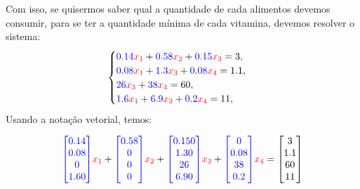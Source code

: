 \begin{frame}[label=vetores]
Com isso, se quisermos saber qual a quantidade de cada alimentos devemos consumir, para se ter a quantidade mínima de cada vitamina, devemos resolver o sistema:
\[
\begin{cases}
{\color{blue}0.14 } {\color{red}x_1}+ {\color{blue}0.58}{\color{red}x_2}+ {\color{blue}0.15}{\color{red}x_3}= 3,\\
{\color{blue}0.08}{\color{red}x_1}+{\color{blue}1.3}{\color{red}x_3}+{\color{blue}0.08}{\color{red}x_4}= 1.1,\\
{\color{blue}26}{\color{red}x_3}+{\color{blue}38}{\color{red}x_4}=  60,\\
{\color{blue}1.6}{\color{red}x_1}+{\color{blue}6.9}{\color{red}x_3}+{\color{blue}0.2}{\color{red}x_4}=  11,
\end{cases} 
\]
Usando a notação vetorial, temos:

\[
{\color{blue}
\begin{bmatrix}
0.14 \\ 0.08 \\ 0 \\ 1.60
\end{bmatrix}} {\color{red}x_1}+
{\color{blue}
\begin{bmatrix}
0.58 \\ 0 \\ 0 \\ 0
\end{bmatrix}} {\color{red}x_2}+
{\color{blue}
\begin{bmatrix}
0.150 \\ 1.30 \\ 26 \\ 6.90
\end{bmatrix}} {\color{red}x_3}+
{\color{blue}
\begin{bmatrix}
0\\ 0.08 \\ 38 \\ 0.2
\end{bmatrix}} {\color{red}x_4}=
\begin{bmatrix}
3 \\ 1.1\\ 60 \\ 11
\end{bmatrix}
\]
\end{frame}

